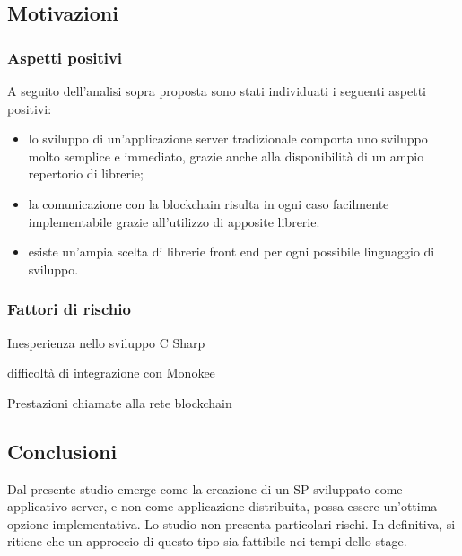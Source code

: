 \subsection{Motivazioni}
\subsubsection{Aspetti positivi}
A seguito dell’analisi sopra proposta sono stati individuati i seguenti aspetti positivi:
\begin{itemize}
    \item lo sviluppo di un’applicazione server tradizionale comporta uno sviluppo molto semplice e immediato, grazie anche alla disponibilità di un ampio repertorio di librerie;
    \item la comunicazione con la blockchain risulta in ogni caso facilmente implementabile grazie all’utilizzo di apposite librerie.
    \item esiste un’ampia scelta di librerie front end per ogni possibile linguaggio di sviluppo.
\end{itemize}
    
\subsubsection{Fattori di rischio}
\begin{risk}{Inesperienza nello sviluppo C Sharp}
    \label{risk:centralization-vision-from-user} 
\end{risk}
\begin{risk}{difficoltà di integrazione con Monokee}
    \label{risk:centralization-vision-from-user} 
\end{risk}
\begin{risk}{Prestazioni chiamate alla rete blockchain}
    \label{risk:centralization-vision-from-user} 
\end{risk}
\subsection{Conclusioni}
Dal presente studio emerge come la creazione di un SP sviluppato come applicativo server, e non come applicazione distribuita, possa essere un’ottima opzione implementativa. Lo studio non presenta particolari rischi. In definitiva, si ritiene che un approccio di questo tipo sia fattibile nei tempi dello stage.

